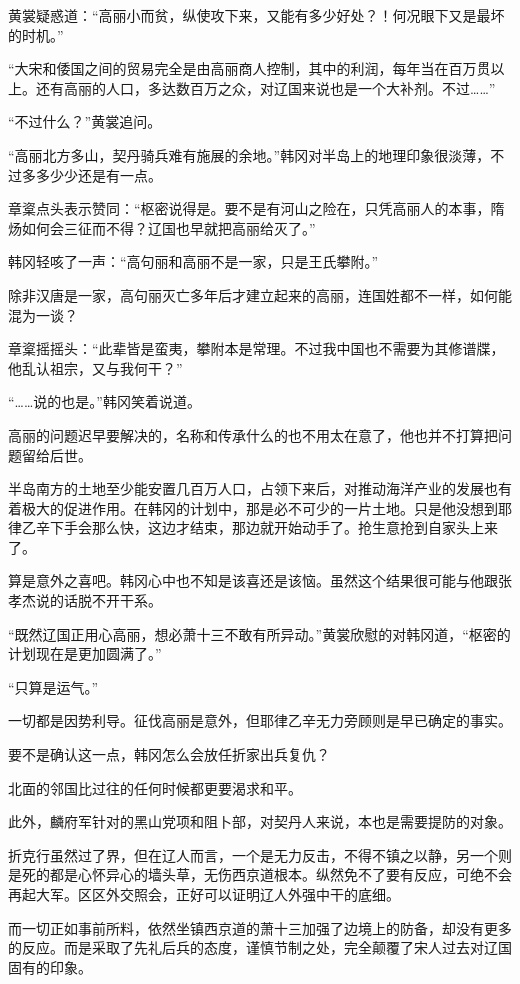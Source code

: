 黄裳疑惑道：“高丽小而贫，纵使攻下来，又能有多少好处？！何况眼下又是最坏的时机。”

“大宋和倭国之间的贸易完全是由高丽商人控制，其中的利润，每年当在百万贯以上。还有高丽的人口，多达数百万之众，对辽国来说也是一个大补剂。不过……”

“不过什么？”黄裳追问。

“高丽北方多山，契丹骑兵难有施展的余地。”韩冈对半岛上的地理印象很淡薄，不过多多少少还是有一点。

章楶点头表示赞同：“枢密说得是。要不是有河山之险在，只凭高丽人的本事，隋炀如何会三征而不得？辽国也早就把高丽给灭了。”

韩冈轻咳了一声：“高句丽和高丽不是一家，只是王氏攀附。”

除非汉唐是一家，高句丽灭亡多年后才建立起来的高丽，连国姓都不一样，如何能混为一谈？

章楶摇摇头：“此辈皆是蛮夷，攀附本是常理。不过我中国也不需要为其修谱牒，他乱认祖宗，又与我何干？”

“……说的也是。”韩冈笑着说道。

高丽的问题迟早要解决的，名称和传承什么的也不用太在意了，他也并不打算把问题留给后世。

半岛南方的土地至少能安置几百万人口，占领下来后，对推动海洋产业的发展也有着极大的促进作用。在韩冈的计划中，那是必不可少的一片土地。只是他没想到耶律乙辛下手会那么快，这边才结束，那边就开始动手了。抢生意抢到自家头上来了。

算是意外之喜吧。韩冈心中也不知是该喜还是该恼。虽然这个结果很可能与他跟张孝杰说的话脱不开干系。

“既然辽国正用心高丽，想必萧十三不敢有所异动。”黄裳欣慰的对韩冈道，“枢密的计划现在是更加圆满了。”

“只算是运气。”

一切都是因势利导。征伐高丽是意外，但耶律乙辛无力旁顾则是早已确定的事实。

要不是确认这一点，韩冈怎么会放任折家出兵复仇？

北面的邻国比过往的任何时候都更要渴求和平。

此外，麟府军针对的黑山党项和阻卜部，对契丹人来说，本也是需要提防的对象。

折克行虽然过了界，但在辽人而言，一个是无力反击，不得不镇之以静，另一个则是死的都是心怀异心的墙头草，无伤西京道根本。纵然免不了要有反应，可绝不会再起大军。区区外交照会，正好可以证明辽人外强中干的底细。

而一切正如事前所料，依然坐镇西京道的萧十三加强了边境上的防备，却没有更多的反应。而是采取了先礼后兵的态度，谨慎节制之处，完全颠覆了宋人过去对辽国固有的印象。

